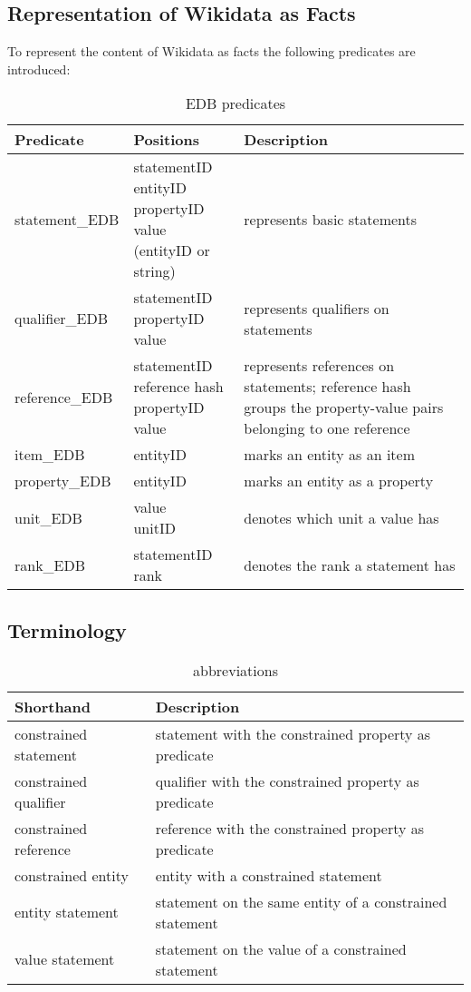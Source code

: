 \documentclass[hyperref,bachelorofscience,fleqn]{cgvpub}
\begin{document}
\subsection{Representation of Wikidata as Facts}
To represent the content of Wikidata as facts the following predicates are introduced:
\begin{table}[H]
\caption{EDB predicates}\label{tab_predicates}
\begin{tabular}{llp{8.5cm}}
Predicate & Positions & Description \\
\hline
statement\_EDB & \makecell{statementID \\ entityID \\ propertyID \\ value (entityID or string)} & represents basic statements \\
\hline
qualifier\_EDB & \makecell{statementID \\ propertyID \\ value} & represents qualifiers on statements \\
\hline
reference\_EDB & \makecell{statementID \\ reference hash \\ propertyID \\ value} & represents references on statements; reference hash groups the property-value pairs belonging to one reference \\
\hline
item\_EDB & entityID & marks an entity as an item \\
property\_EDB & entityID & marks an entity as a property \\
\hline
unit\_EDB & \makecell{value \\ unitID} & denotes which unit a value has \\
\hline
rank\_EDB & \makecell{statementID \\ rank} & denotes the rank a statement has
\end{tabular}
\end{table}

\subsection{Terminology}
\begin{table}[H]
\caption{abbreviations}\label{tab_abbreviations}
\begin{tabular}{ll}
Shorthand & Description \\
\hline
constrained statement & statement with the constrained property as predicate \\
constrained qualifier & qualifier with the constrained property as predicate \\
constrained reference & reference with the constrained property as predicate \\
constrained entity & entity with a constrained statement \\
entity statement & statement on the same entity of a constrained statement \\
value statement & statement on the value of a constrained statement
\end{tabular}
\end{table}
\end{document}
